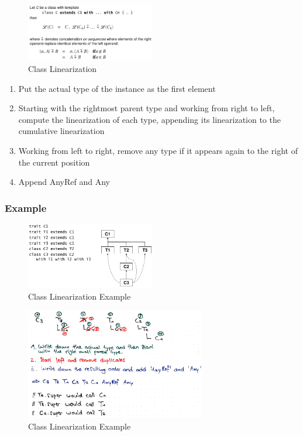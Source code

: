 \begin{figure}[H]
\centering
\includegraphics[width=0.5\textwidth]{figures/classLinearization.png}
\caption{Class Linearization}
\end{figure}

\begin{enumerate}
\def\labelenumi{\arabic{enumi}.}
\tightlist
\item
  Put the actual type of the instance as the first element
\item
  Starting with the rightmost parent type and working from right to
  left, compute the linearization of each type, appending its
  linearization to the cumulative linearization
\item
  Working from left to right, remove any type if it appears again to the
  right of the current position
\item
  Append AnyRef and Any
\end{enumerate}

\hypertarget{example}{%
\subsubsection{Example}\label{example}}

\begin{figure}[H]
\centering
\includegraphics[width=0.5\textwidth]{figures/classLinearizationExample.png}
\caption{Class Linearization Example}
\end{figure}

\begin{figure}[H]
\centering
\includegraphics[width=0.7\textwidth]{figures/classLinearization2.png}
\caption{Class Linearization Example}
\end{figure}

